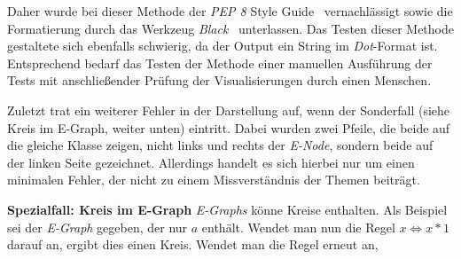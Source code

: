 Daher wurde bei dieser Methode der \textit{PEP 8} Style Guide~\cite{pep} vernachlässigt sowie die Formatierung durch das Werkzeug \textit{Black}~\cite{black} unterlassen.
Das Testen dieser Methode gestaltete sich ebenfalls schwierig, da der Output ein String im \textit{Dot}-Format ist. Entsprechend bedarf das Testen der Methode
einer manuellen Ausführung der Tests mit anschließender Prüfung der Visualisierungen durch einen Menschen.

Zuletzt trat ein weiterer Fehler in der Darstellung auf, wenn der Sonderfall (siehe Kreis im E-Graph, weiter unten) eintritt. 
Dabei wurden zwei Pfeile, die beide auf die gleiche Klasse zeigen, nicht links und rechts der \textit{E-Node}, sondern beide auf der linken Seite gezeichnet.
Allerdings handelt es sich hierbei nur um einen minimalen Fehler, der nicht zu einem Missverständnis der Themen beiträgt.

\noindent\textbf{Spezialfall: Kreis im E-Graph} \textit{E-Graphs} könne Kreise enthalten. Als Beispiel sei der \textit{E-Graph} gegeben, der nur $a$ enthält.
Wendet man nun die Regel $x \Leftrightarrow x * 1$ darauf an, ergibt dies einen Kreis. Wendet man die Regel erneut an, 



